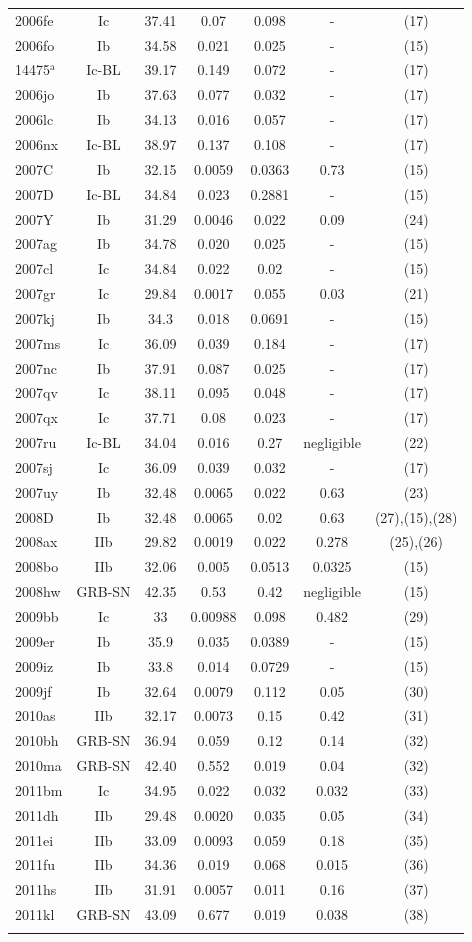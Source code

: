 \documentclass[a4paper,fleqn,usenatbib]{mnras}
\begin{document}
\begin{table}
\begin{minipage}{125mm}
\begin{tabular}{lcccccc}
2006fe&Ic&37.41&0.07&0.098&-&(17)\\
2006fo&Ib&34.58&0.021&0.025&-&(15)\\
14475$^{\mathrm{a}}$&Ic-BL&39.17&0.149&0.072&-&(17)\\
2006jo&Ib&37.63&0.077&0.032&-&(17)\\
2006lc&Ib&34.13&0.016&0.057&-&(17)\\
2006nx&Ic-BL&38.97&0.137&0.108&-&(17)\\
2007C&Ib&32.15&0.0059&0.0363&0.73&(15)\\
2007D&Ic-BL&34.84&0.023&0.2881&-&(15)\\
2007Y&Ib&31.29&0.0046&0.022&0.09&(24)\\
2007ag&Ib&34.78&0.020&0.025&-&(15)\\
2007cl&Ic&34.84&0.022&0.02&-&(15)\\
2007gr&Ic&29.84&0.0017&0.055&0.03&(21)\\
2007kj&Ib&34.3&0.018&0.0691&-&(15)\\
2007ms&Ic&36.09&0.039&0.184&-&(17)\\
2007nc&Ib&37.91&0.087&0.025&-&(17)\\
2007qv&Ic&38.11&0.095&0.048&-&(17)\\
2007qx&Ic&37.71&0.08&0.023&-&(17)\\
2007ru&Ic-BL&34.04&0.016&0.27&negligible&(22)\\
2007sj&Ic&36.09&0.039&0.032&-&(17)\\
2007uy&Ib&32.48&0.0065&0.022&0.63&(23)\\
2008D&Ib&32.48&0.0065&0.02&0.63&(27),(15),(28)\\
2008ax&IIb&29.82&0.0019&0.022&0.278&(25),(26)\\
2008bo&IIb&32.06&0.005&0.0513&0.0325&(15)\\
2008hw&GRB-SN&42.35&0.53&0.42&negligible&(15)\\
2009bb&Ic&33&0.00988&0.098&0.482&(29)\\
2009er&Ib&35.9&0.035&0.0389&-&(15)\\
2009iz&Ib&33.8&0.014&0.0729&-&(15)\\
2009jf&Ib&32.64&0.0079&0.112&0.05&(30)\\
2010as&IIb&32.17&0.0073&0.15&0.42&(31)\\
2010bh&GRB-SN&36.94&0.059&0.12&0.14&(32)\\
2010ma&GRB-SN&42.40&0.552&0.019&0.04&(32)\\
2011bm&Ic&34.95&0.022&0.032&0.032&(33)\\
2011dh&IIb&29.48&0.0020&0.035&0.05&(34)\\
2011ei&IIb&33.09&0.0093&0.059&0.18&(35)\\
2011fu&IIb&34.36&0.019&0.068&0.015&(36)\\
2011hs&IIb&31.91&0.0057&0.011&0.16&(37)\\
2011kl&GRB-SN&43.09&0.677&0.019&0.038&(38)\\
  \hline
\label{database}
\end{tabular}
\end{minipage}
\end{table}
\end{document}
